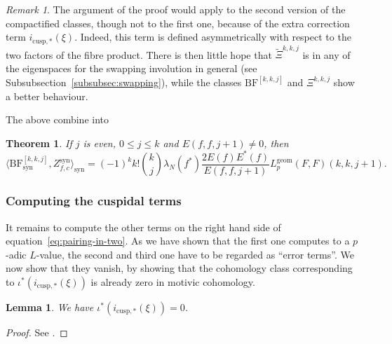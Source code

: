\documentclass[11pt, a4paper, reqno]{amsart}
\theoremstyle{definition}
\theoremstyle{plain}
\newtheorem{theorem}[definition]{Theorem}
\newtheorem{lemma}[definition]{Lemma}
\theoremstyle{remark}
\newtheorem*{remark}{Remark}
\DeclareMathOperator{\syn}{syn}
\newcommand{\BF}{\mathrm{BF}}
\newcommand{\lcBF}{\widetilde{\Xi}}
\newcommand{\cBF}{\Xi}
\newcommand{\Lgeom}{L_p^{\mathrm{geom}}}
\renewcommand{\le}{\leqslant}
\renewcommand{\leq}{\le}
\begin{document}
  \begin{remark}
   The argument of the proof would apply to the second version of the compactified classes, though not to the first one, because of the extra correction term $i_{\mathrm{cusp},*}(\xi)$. Indeed, this term is defined asymmetrically with respect to the two factors of the fibre product. There is then little hope that $\lcBF^{k,k,j}$ is in any of the eigenspaces for the swapping involution in general (see Subsubsection~\ref{subsubsec:swapping}), while the classes $\BF^{[k,k,j]}$ and $\cBF^{k,k,j}$ show a better behaviour.
  \end{remark}

The above combine into
\begin{theorem}
    \label{thm:first-term}
    If $j$ is even, $0\leq j\leq k$ and $E(f,f,j+1)\neq 0$, then
    \[
        \langle \BF^{[k,k,j]}_{\syn},Z_{f,c}^{\syn}\rangle_{\syn} = (-1)^k k!\binom{k}{j}\lambda_N(f^*)\frac{2E(f)E^*(f)}{E(f,f,j+1)}\Lgeom(F,F)(k,k,j+1).
    \]
\end{theorem}

\subsubsection*{Computing the cuspidal terms}
It remains to compute the other terms on the right hand side of equation~\eqref{eq:pairing-in-two}. As we have shown that the first one computes to a $p$-adic $L$-value, the second and third one have to be regarded as ``error terms''. We now show that they vanish, by showing that the cohomology class corresponding to $\iota^*(i_{\mathrm{cusp},*}(\xi))$ is already zero in motivic cohomology.
\begin{lemma}
    \label{lemma:cuspidal-is-zero}
    We have $\iota^*(i_{\mathrm{cusp},*}(\xi)) = 0$.
\end{lemma}

\begin{proof} See \cite[Proposition~9.4]{brunaultchida16}.\end{proof}
\end{document}
